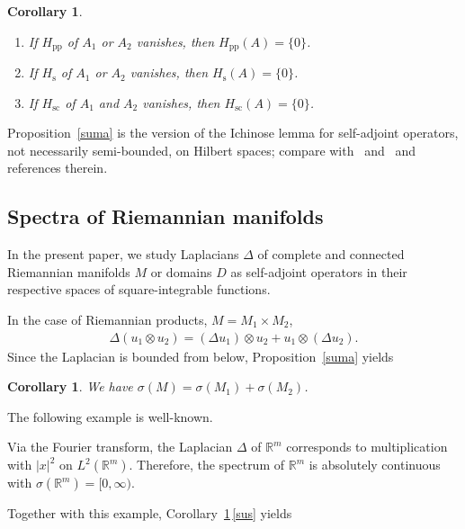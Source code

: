 \documentclass[10pt,a4paper]{amsart}
\numberwithin{equation}{section}
\newtheorem{Corollary}[Theorem]{Corollary}
\def\p{\mathrm{pp}}
\def\sc{\mathrm{sc}}
\def\s{\mathrm s}
\def\R{\mathbb R}
\begin{document}
\begin{Corollary}\label{sumc}\quad
\begin{enumerate}[label={\rm (\arabic*)}]\itemsep=0pt
\item If $H_{\p}$ of $A_1$ \emph{or} $A_2$ vanishes, then $H_{\p}(A)=\{0\}$.%
\item If $H_{\s}$ of $A_1$ \emph{or} $A_2$ vanishes, then $H_{\s}(A)=\{0\}$.\label{sus}
\item If $H_{\sc}$ of $A_1$ \emph{and} $A_2$ vanishes, then $H_{\sc}(A)=\{0\}$.%
\end{enumerate}
\end{Corollary}

Proposition~\ref{suma} is the version of the Ichinose lemma for self-adjoint operators, not necessarily semi-bounded, on Hilbert spaces;
compare with~\cite[Theorem 4.1]{Ich72} and~\cite[Section XIII.9]{ReedSimon78}
and references therein.

\subsection{Spectra of Riemannian manifolds}\label{subrie}
In the present paper, we study Laplacians $\Delta$
of complete and connected Riemannian manifolds $M$ or domains $D$
as self-adjoint operators in their respective spaces of square-integrable functions.

In the case of Riemannian products, $M=M_1\times M_2$,
\begin{align*}%
	\Delta(u_1\otimes u_2) = (\Delta u_1)\otimes u_2 + u_1\otimes(\Delta u_2).
\end{align*}
Since the Laplacian is bounded from below, Proposition~\ref{suma} yields

\begin{Corollary}\label{sumdel}
We have $\sigma(M)=\sigma(M_1)+\sigma(M_2)$.
\end{Corollary}

The following example is well-known.

\begin{exa}\label{rmac}
Via the Fourier transform, the Laplacian $\Delta$ of $\R^m$ corresponds to multiplication with $|x|^2$ on $L^2(\R^m)$.
Therefore, the spectrum of $\R^m$ is absolutely continuous with ${\sigma(\R^m)=[0,\infty)}$.
\end{exa}

Together with this example, Corollary~\ref{sumc}\,\ref{sus} yields
\end{document}
